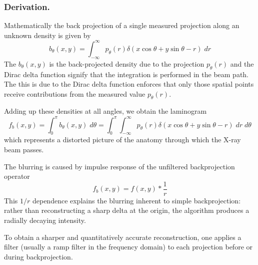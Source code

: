 \documentclass[../../../main.tex]{subfiles}
\begin{document}
\subsubsection{Derivation.} 
Mathematically the back projection of a single measured projection along an unknown density is given by
\begin{equation*}
    b_\theta(x,y)=\int_{-\infty}^{\infty} p_\theta(r)\delta(x\cos\theta+y\sin\theta -r)\;dr
\end{equation*}
The $    b_\theta(x,y)$ is the back-projected density due to the projection $p_\theta(r)$ and the  Dirac delta function signify that the integration is performed in the beam path.
The this is due to the Dirac delta function enforces that only those spatial points receive contributions from the measured value $p_\theta(r)$.

Adding up these densities at all angles, we obtain the laminogram
\begin{equation*}
    f_b(x,y)=\int_{0 }^{\pi} b_\theta(x,y)\;d\theta=\int_{0 }^{\pi}\int_{-\infty}^{\infty} p_\theta(r)\delta(x\cos\theta+y\sin\theta -r)\;dr\;d\theta
\end{equation*}
which represents a distorted picture of the anatomy through which the X-ray beam passes.

The blurring is caused by impulse response of the unfiltered backprojection operator
\begin{equation*}
    f_b(x,y)=f(x,y)*\frac{1 }{r}
\end{equation*}
This $1/r$ dependence explains the blurring inherent to simple backprojection: rather than reconstructing a sharp delta at the origin, the algorithm produces a radially decaying intensity.

To obtain a sharper and quantitatively accurate reconstruction, one applies a filter (usually a ramp filter in the frequency domain) to each projection before or during backprojection.
\end{document}
